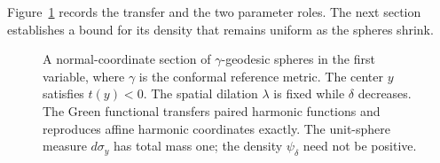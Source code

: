 Figure~\ref{fig:shrinking-functional} records the transfer and the two
parameter roles.  The next section establishes a bound for its density
that remains uniform as the spheres shrink.
\begin{figure}[htbp]
\centering

\caption{A normal-coordinate section of $\gamma$-geodesic spheres in the
first variable, where $\gamma$ is the conformal reference metric.  The
center $y$ satisfies $t(y)<0$.  The spatial dilation $\lambda$ is fixed
while $\delta$ decreases.  The Green functional transfers paired harmonic
functions and reproduces affine harmonic coordinates exactly.  The
unit-sphere measure $d\sigma_y$ has total mass one; the density
$\psi_\delta$ need not be positive.}
\label{fig:shrinking-functional}
\end{figure}
